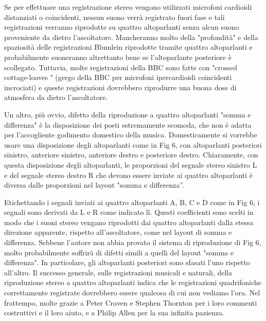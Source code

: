 \documentclass[11pt]{article}
\begin{document}
\begin{multicols*}{2}
Se per effettuare una registrazione stereo vengono utilizzati microfoni cardioidi distanziati o coincidenti, nessun suono verrà registrato fuori fase e tali registrazioni verranno riprodotte su quattro altoparlanti senza alcun suono proveniente da dietro l'ascoltatore. Mancheranno molto della "profondità" e della spaziosità delle registrazioni Blumlein riprodotte tramite quattro altoparlanti e probabilmente suoneranno altrettanto bene se l'altoparlante posteriore è scollegato. Tuttavia, molte registrazioni della BBC sono fatte con "crossed cottage-loaves 
" (gergo della BBC per microfoni ipercardioidi coincidenti incrociati) e queste registrazioni dovrebbero riprodurre una buona dose di atmosfera da dietro l’ascoltatore.

Un altro, più ovvio, difetto della riproduzione a quattro altoparlanti "somma e differenza" è la disposizione dei posti estremamente scomoda, che non è adatta per l'accogliente godimento domestico della musica. Domesticamente si vorrebbe usare una disposizione degli altoparlanti come in Fig 6, con altoparlanti posteriori sinistro, anteriore sinistro, anteriore destro e posteriore destro. Chiaramente, con questa disposizione degli altoparlanti, le proporzioni del segnale stereo sinistro L e del segnale stereo destro R che devono essere inviate ai quattro altoparlanti è diversa dalle proporzioni nel layout "somma e differenza”.

Etichettando i segnali inviati ai quattro altoparlanti A, B, C e D come in Fig 6, i segnali sono derivati da L e R come indicato lì. Questi coefficienti sono scelti in modo che i suoni stereo vengano riprodotti dai quattro altoparlanti dalla stessa direzione apparente, rispetto all'ascoltatore, come nel layout di somma e differenza. Sebbene l'autore non abbia provato il sistema di riproduzione di Fig 6, molto probabilmente soffrirà di difetti simili a quelli del layout "somma e differenza". In particolare, gli altoparlanti posteriori sono sfasati l'uno rispetto all'altro.
Il successo generale, sulle registrazioni musicali e naturali, della riproduzione stereo a quattro altoparlanti indica che le registrazioni quadrifoniche correttamente registrate dovrebbero essere qualcosa di cui non vediamo l'ora. Nel frattempo, molte grazie a Peter Craven e Stephen Thornton per i loro commenti costruttivi e il loro aiuto, e a Philip Allen per la sua infinita pazienza.





\end{multicols*}
\end{document}
